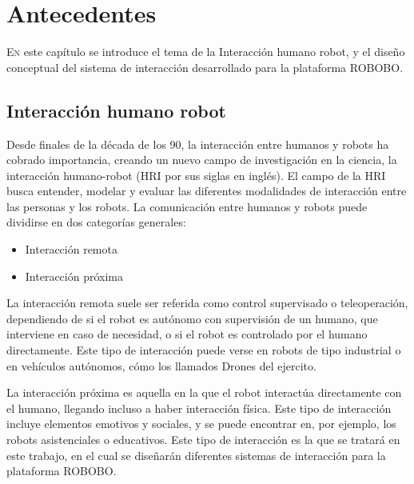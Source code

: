 \chapter{Antecedentes}
\label{chap:antecedentes}





\lettrine{E}{n} este capítulo se introduce el tema de la Interacción humano robot, 	y el diseño conceptual del sistema de interacción desarrollado para la plataforma ROBOBO.

\section{Interacción humano robot}
 \label{sec:hri-intro}
 
 Desde finales de la década de los 90, la interacción entre humanos y robots ha cobrado importancia, creando un nuevo campo de investigación en la ciencia\cite{goodrich2007human}, la interacción humano-robot (HRI por sus siglas en inglés). El campo de la HRI busca entender, modelar y evaluar las diferentes modalidades de interacción entre las personas y los robots. La comunicación entre humanos y robots puede dividirse  en dos categorías generales:
 \begin{itemize}
 	\item Interacción remota
 	\item Interacción próxima
 \end{itemize}
 
 La interacción remota suele ser referida como control supervisado o teleoperación, dependiendo de si el robot es autónomo con supervisión de un humano, que interviene en caso de necesidad, o si el robot es controlado por el humano directamente. Este tipo de interacción puede verse en robots de tipo industrial o en vehículos autónomos, cómo los llamados Drones del ejercito.
 
 La interacción próxima es aquella en la que el robot interactúa directamente con el humano, llegando incluso a haber interacción física. Este tipo de interacción incluye elementos emotivos y sociales, y se puede encontrar en, por ejemplo, los robots asistenciales o educativos. Este tipo de interacción es la que se tratará en este trabajo, en el cual se diseñarán diferentes sistemas de interacción para la plataforma ROBOBO.
 

